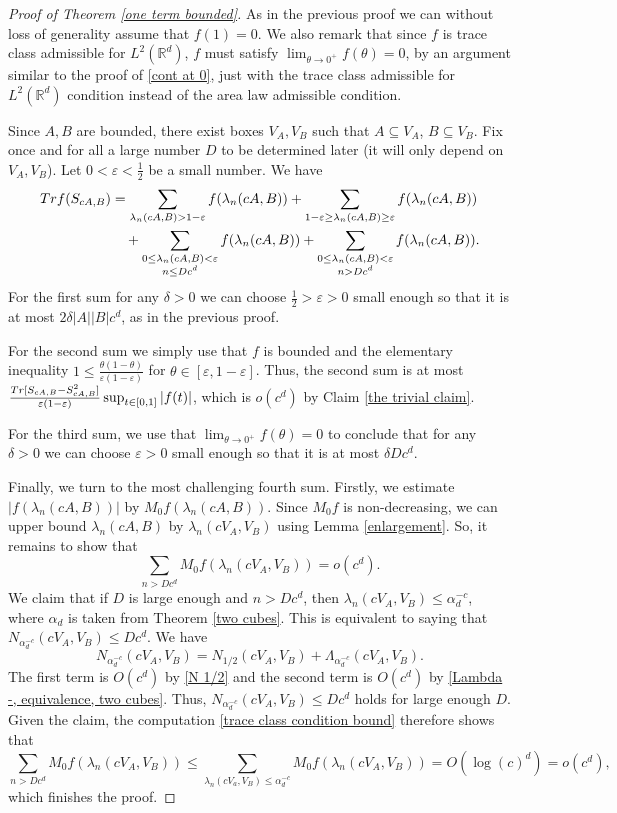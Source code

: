\documentclass[10pt,a4paper]{amsart}
\newcommand{\R}{\mathbb{R}}
\newcommand{\eps}{\varepsilon}
\begin{document}
\begin{proof}[Proof of Theorem \ref{one term bounded}]
As in the previous proof we can without loss of generality assume that $f(1) = 0$. We also remark that since $f$ is trace class admissible for $L^2(\R^d)$, $f$ must satisfy $\lim_{\theta\to 0^+} f(\theta) =0$, by an argument similar to the proof of \eqref{cont at 0}, just with the trace class admissible for $L^2(\R^d)$ condition instead of the area law admissible condition.

Since $A, B$ are bounded, there exist boxes $V_A, V_B$ such that $A\subseteq V_A$, $B\subseteq V_B$. Fix once and for all a large number $D$ to be determined later (it will only depend on $V_A, V_B$). Let $0 < \eps < \frac{1}{2}$ be a small number. We have
\begin{align*}
{\rm Tr}f(S_{cA,B}) &= \sum_{\lambda_n(cA, B) > 1-\eps}f(\lambda_n(cA,B))  +\sum_{1-\eps\ge\lambda_n(cA, B) \geq \eps }f(\lambda_n(cA,B))\\
&\quad +\sum_{\substack{0 \le \lambda_n(cA,B)< \eps \\ n\le Dc^d}} f(\lambda_n(cA,B))+ \sum_{\substack{0 \le \lambda_n(cA,B)< \eps\\ n> Dc^d}} f(\lambda_n(cA,B)).
\end{align*}
For the first sum for any $\delta > 0$ we can choose $\frac{1}{2}>\eps > 0$ small enough so that it is at most $2\delta |A| |B| c^d$, as in the previous proof. 

For the second sum we simply use that $f$ is bounded and the elementary inequality $1\leq \frac{\theta(1-\theta)}{\eps(1-\eps)}$ for $\theta\in [\eps, 1-\eps]$. Thus, the second sum is at most $\frac{ {\rm Tr}[S_{cA,B}-S_{cA,B}^2]}{\eps(1-\eps)}\sup_{t\in [0,1]} |f(t)|$, which is $o(c^d)$ by Claim \ref{the trivial claim}. 

For the third sum, we use that $\lim_{\theta\to 0^+} f(\theta) =0$ to conclude that for any $\delta > 0$ we can choose $\eps > 0$ small enough so that it is at most $\delta Dc^d$.

Finally, we turn to the most challenging fourth sum. Firstly, we estimate $|f(\lambda_n(cA, B))|$ by $M_0f(\lambda_n(cA,B))$. Since $M_0f$ is non-decreasing, we can upper bound $\lambda_n(cA,B)$ by $\lambda_n(cV_A, V_B)$ using Lemma \ref{enlargement}. So, it remains to show that
$$\sum_{n > Dc^d} M_0f(\lambda_n(cV_A, V_B)) = o(c^d).$$
We claim that if $D$ is large enough and $n> D c^d$, then $\lambda_n(cV_A, V_B) \le \alpha_d^{-c}$, where $\alpha_d$ is taken from Theorem \ref{two cubes}. This is equivalent to saying that $N_{\alpha_d^{-c}}(cV_A, V_B)\le Dc^d$. We have
$$N_{\alpha_d^{-c}}(cV_A, V_B) = N_{1/2}(cV_A,V_B) + \Lambda_{\alpha_d^{-c}}(cV_A,V_B).$$
The first term is $O(c^d)$ by \eqref{N 1/2} and the second term is $O(c^d)$ by \eqref{Lambda -, equivalence, two cubes}. Thus, $N_{\alpha_d^{-c}}(cV_A, V_B)\le Dc^d$ holds for large enough $D$. Given the claim, the computation \eqref{trace class condition bound} therefore shows that
\[
\sum_{n > Dc^d} M_0f(\lambda_n(cV_A, V_B)) \leq \sum_{\lambda_n(cV_a,V_B) \leq \alpha_d^{-c}}  M_0f(\lambda_n(cV_A, V_B)) = O(\log(c)^d) = o(c^d),
\]
which finishes the proof.
\end{proof}
\end{document}
